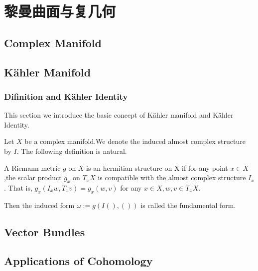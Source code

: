 \ifx\allfiles\undefined

	
	
\else
\fi
\part{黎曼曲面与复几何}



\chapter{Complex Manifold}

\chapter{K\"{a}hler Manifold}
\section{Difinition and K\"{a}hler Identity}
This section we introduce the basic concept of K\"{a}hler manifold and K\"{a}hler Identity.

Let $X$ be a complex manifold.We denote the induced almost complex structure by $I$. The following definition is natural.

\begin{definition}
A Riemann metric $g$ on $X$ is an hermitian structure on X if for any point $x \in X$,the scalar product $g_x$ on $T_x X$ is compatible with the almost complex structure $I_x$. That is, $g_x(I_x w,T_x v)=g_x(w,v)$ for any $x \in X,w,v \in T_x X$.

Then the induced form $\omega:=g(I(),())$ is called the fundamental form.
\end{definition}

\chapter{Vector Bundles}

\chapter{Applications of Cohomology}

\ifx\allfiles\undefined
	
	
	
	
	\else
	\fi